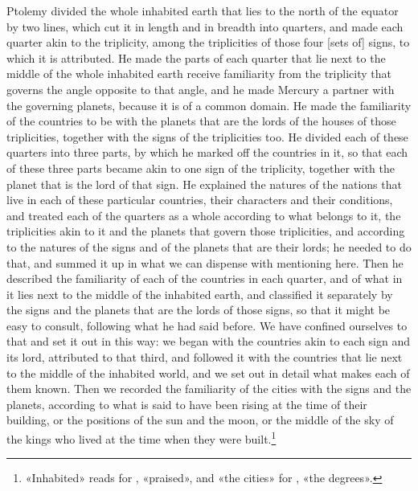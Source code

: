\documentclass[11pt]{article}
\newcommand{\Fol}[1]{\marginpar{\footnotesize\color{gray}f.\,#1}}
\begin{document}
\par \Fol{23v}Ptolemy divided the whole inhabited earth that lies to the north of the equator by two lines, which cut it in length and in breadth into quarters, and made each quarter akin to the triplicity, among the triplicities of those four [sets of] signs, to which it is attributed. He made the parts of each quarter that lie next to the middle of the whole inhabited earth receive familiarity from the triplicity that governs the angle opposite to that angle, and he made Mercury a partner with the governing planets, because it is of a common domain. He made the familiarity of the countries to be with the planets that are the lords of the houses of those triplicities, together with the signs of the triplicities too. He divided each of these quarters into three parts, by which he marked off the countries in it, so that each of these three parts became akin to one sign of the triplicity, together with the planet that is the lord of that sign. He explained the natures of the nations that live in each of these particular countries, their characters and their conditions, and treated each of the quarters as a whole according to what belongs to it, the triplicities akin to it and the planets that govern those triplicities, and according to the natures of the signs and of the planets that are their lords; he needed to do that, and summed it up in what we can dispense with mentioning here. Then he described the familiarity of each of the countries in each quarter, and of what in it lies next to the middle of the inhabited earth, and classified it separately by the signs and the planets that are the lords of those signs, so that it might be easy to consult, following what he had said before. We have confined ourselves to that and set it out in this way: we began with the countries akin to each sign and its lord, attributed to that third, and followed it with the countries that lie next to the middle of the inhabited world, and we set out in detail what makes each of them known. Then we recorded the familiarity of the cities with the signs and the planets, according to what is said to have been rising at the time of their building, or the positions of the sun and the moon, or the middle of the sky of the kings who lived at the time when they were built.\footnote{«Inhabited» reads  for , «praised», and «the cities»  for , «the degrees».}\par
\end{document}
